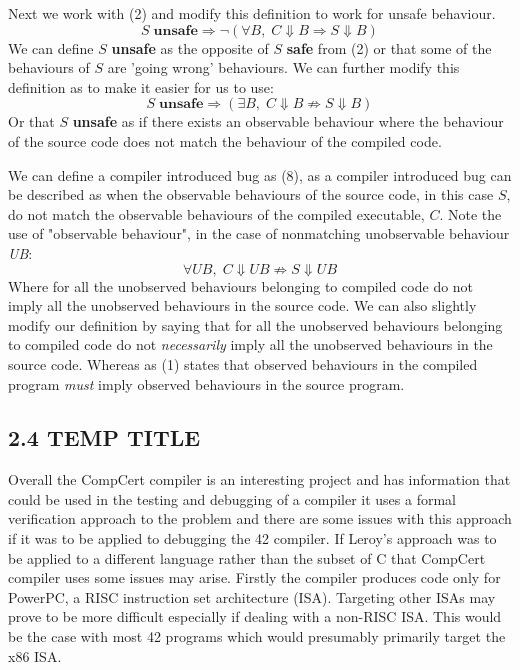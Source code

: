 \documentclass[11pt, a4paper, twoside, openright, twocolumn]{report}
\begin{document}
Next we work with (2) and modify this definition to work for unsafe behaviour.
\begin{equation}
S \; \textbf{unsafe} \Longrightarrow \neg (\forall B, \; C \Downarrow B \Longrightarrow S \Downarrow B)
\end{equation}
We can define $S$ \textbf{unsafe} as the opposite of $S$ \textbf{safe} from (2) or that some of the behaviours of $S$ are 'going wrong'
behaviours. We can further modify this definition as to make it easier for us to use:
\begin{equation}
S \; \textbf{unsafe} \Longrightarrow (\exists B, \; C \Downarrow B \not \Longrightarrow S \Downarrow B)
\end{equation}
Or that $S$ \textbf{unsafe}  as if there exists an observable behaviour where the behaviour of the source code does not match the behaviour of the
compiled code. 

We can define a compiler introduced bug as (8), as a compiler introduced bug can be described as when the observable behaviours of the source code,
in this case $S$, do not match the observable behaviours of the compiled executable, $C$. Note the use of "observable behaviour", in the case of nonmatching unobservable behaviour \textit{UB}:
\begin{equation}
\forall \mathit{UB}, \; C \Downarrow  \mathit{UB} \not \Longrightarrow S \Downarrow \mathit{UB}
\end{equation} 
Where for all the unobserved behaviours belonging to compiled code do not imply all the unobserved behaviours in the source code. We can also slightly modify
our definition by saying that for all the unobserved behaviours belonging to compiled code do not \textit{necessarily} imply all the unobserved
behaviours in the source code. Whereas as (1) states that observed behaviours in the compiled program \textit{must} imply observed behaviours in the
source program.
\subsection*{2.4 TEMP TITLE}
Overall the CompCert compiler is an interesting project and has information that could be used in the testing and debugging of a compiler it uses a formal verification
approach to the problem and there are some issues with this approach if it was to be applied to debugging the 42 compiler. If Leroy's approach \cite{Leroy:2009}
 was to be applied to a different language rather than the subset of C that CompCert compiler uses some issues may arise. 
Firstly the compiler produces code only for PowerPC, a RISC instruction set architecture (ISA). 
Targeting other ISAs may prove to be more difficult especially if dealing with a non-RISC \cite{Patterson:1980} ISA. This would be the case with most 42 programs which would 
presumably primarily target the x86 ISA.
\end{document}
